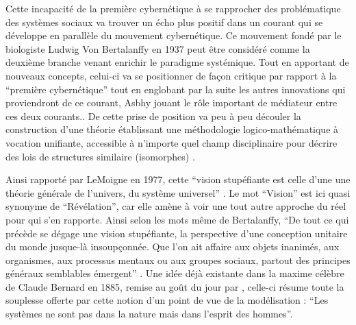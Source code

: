 Cette incapacité de la première cybernétique à se rapprocher des problématique des systèmes sociaux va trouver un écho plus positif dans un courant qui se développe en parallèle du mouvement cybernétique. Ce mouvement fondé par le biologiste Ludwig Von Bertalanffy en 1937 peut être considéré comme la deuxième branche venant enrichir le paradigme systémique. Tout en apportant de nouveaux concepts, celui-ci va se positionner de façon critique par rapport à la \enquote{première cybernétique} tout en englobant par la suite les autres innovations qui proviendront de ce courant, Asbhy jouant le rôle important de médiateur entre ces deux courants.\autocite{Pouvreau2013}. De cette prise de position va peu à peu découler la construction d'une théorie établissant une méthodologie logico-mathématique à vocation unifiante, accessible à n'importe quel champ disciplinaire pour décrire des lois de structures similaire (isomorphes) \autocite{LeMoigne2006a}.

Ainsi rapporté par LeMoigne en 1977, cette \enquote{vision stupéfiante est celle d'une une théorie générale de l'univers, du système universel} \autocite[59]{Lemoigne1977}. Le mot \enquote{Vision} est ici quasi synonyme de \enquote{Révélation}, car elle amène à voir une tout autre approche du réel pour qui s'en rapporte. Ainsi selon les mots même de Bertalanffy, \enquote{De tout ce qui précède se dégage une vision stupéfiante, la perspective d'une conception unitaire du monde jusque-là insoupçonnée. Que l'on ait affaire aux objets inanimés, aux organismes, aux processus mentaux ou aux groupes sociaux, partout des principes généraux semblables émergent} \autocites[59]{Lemoigne1977}{Bertalanffy1961}. Une idée déjà existante dans la maxime célèbre de Claude Bernard en 1885, remise au goût du jour par \textcite{Lemoigne1977}, celle-ci résume toute la souplesse offerte par cette notion d'un point de vue de la modélisation : \enquote{Les systèmes ne sont pas dans la nature mais dans l'esprit des hommes}.

